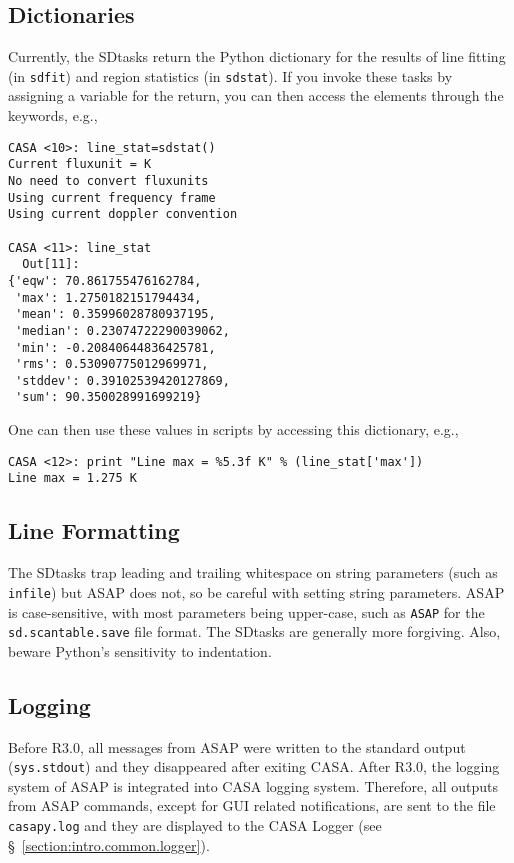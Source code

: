 \subsection{Dictionaries}
\label{section:sd.intro.dict}

Currently, the SDtasks return the Python dictionary 
for the results of line fitting (in {\tt sdfit})
and region statistics (in {\tt sdstat}).  If you invoke
these tasks by assigning a variable for the return,
you can then access the
elements through the keywords, e.g.,
\small
\begin{verbatim}
CASA <10>: line_stat=sdstat()
Current fluxunit = K
No need to convert fluxunits
Using current frequency frame
Using current doppler convention

CASA <11>: line_stat
  Out[11]: 
{'eqw': 70.861755476162784,
 'max': 1.2750182151794434,
 'mean': 0.35996028780937195,
 'median': 0.23074722290039062,
 'min': -0.20840644836425781,
 'rms': 0.53090775012969971,
 'stddev': 0.39102539420127869,
 'sum': 90.350028991699219}
\end{verbatim}
\normalsize
One can then use these values in scripts by accessing this dictionary,
e.g.,
\small
\begin{verbatim}
CASA <12>: print "Line max = %5.3f K" % (line_stat['max'])
Line max = 1.275 K
\end{verbatim}
\normalsize

\subsection{Line Formatting}
\label{section:sd.intro.line}

The SDtasks trap leading and trailing whitespace on string parameters
(such as {\tt infile}) but ASAP does not, so be
careful with setting string parameters.  ASAP is case-sensitive,
with most parameters being upper-case, such as {\tt ASAP} for the
{\tt sd.scantable.save} file format.  The SDtasks are generally
more forgiving.  Also, beware Python's sensitivity to indentation.

\subsection{Logging}
\label{section:sd.intro.log}

Before R3.0, all messages from ASAP were written to the standard output
({\tt sys.stdout}) and they disappeared after exiting CASA. After R3.0, the
logging system of ASAP is integrated into CASA logging system.  Therefore, all outputs from ASAP commands, except for GUI related notifications, are sent to the file {\tt casapy.log} and they
are displayed to the CASA Logger (see \S~\ref{section:intro.common.logger}).

